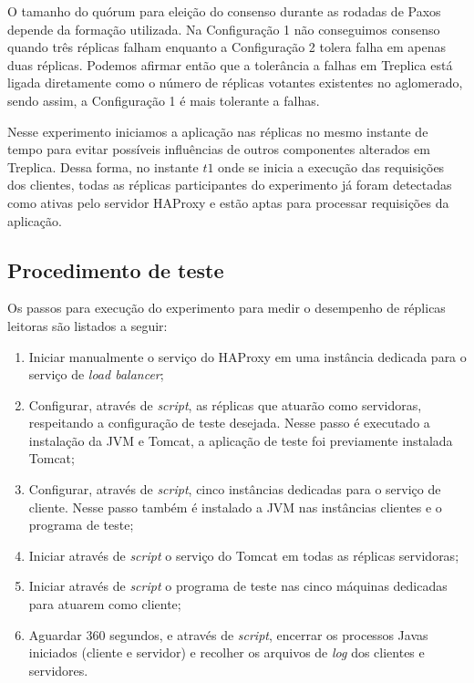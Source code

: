O tamanho do quórum para eleição do consenso durante as rodadas de Paxos depende da
formação utilizada. Na Configuração 1 não conseguimos consenso quando três réplicas falham
enquanto a Configuração 2 tolera falha em apenas duas réplicas. Podemos afirmar então que
a tolerância a falhas em Treplica está ligada diretamente como o número de réplicas
votantes existentes no aglomerado, sendo assim, a Configuração 1 é mais tolerante a
falhas.

Nesse experimento iniciamos a aplicação nas réplicas no mesmo instante de tempo para
evitar possíveis influências de outros componentes alterados em Treplica. Dessa forma, no
instante $t1$ onde se inicia a execução das requisições dos clientes, todas as réplicas
participantes do experimento já foram detectadas como ativas pelo servidor HAProxy e estão
aptas para processar requisições da aplicação.

\subsection{Procedimento de teste}\label{subsec:procedimento_teste_leitora}

Os passos para execução do experimento para medir o desempenho de réplicas leitoras são
listados a seguir:

\begin{enumerate}
  \item Iniciar manualmente o serviço do HAProxy em uma instância dedicada para o serviço
    de \emph{load balancer};
  \item Configurar, através de \emph{script}, as réplicas que atuarão como servidoras,
    respeitando a configuração de teste desejada. Nesse passo é executado a instalação da
    JVM e Tomcat, a aplicação de teste foi previamente instalada Tomcat;
  \item Configurar, através de \emph{script}, cinco instâncias dedicadas para o serviço de
    cliente. Nesse passo também é instalado a JVM nas instâncias clientes e o programa de
    teste;
  \item Iniciar através de \emph{script} o serviço do Tomcat em todas as réplicas
    servidoras;
  \item Iniciar através de \emph{script} o programa de teste nas cinco máquinas dedicadas
    para atuarem como cliente;
  \item Aguardar 360 segundos, e através de \emph{script}, encerrar os processos Javas
    iniciados (cliente e servidor) e recolher os arquivos de \emph{log} dos clientes e
    servidores.
\end{enumerate}

